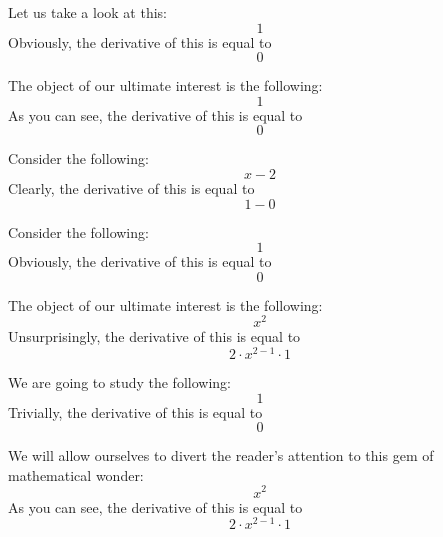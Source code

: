 \documentclass{article}
\begin{document}
Let us take a look at this:
\begin{equation}
1 
\end{equation}
Obviously, the derivative of this is equal to
\begin{equation}
0 
\end{equation}

The object of our ultimate interest is the following:
\begin{equation}
1 
\end{equation}
As you can see, the derivative of this is equal to
\begin{equation}
0 
\end{equation}

Consider the following:
\begin{equation}
x - 2 
\end{equation}
Clearly, the derivative of this is equal to
\begin{equation}
1 - 0 
\end{equation}

Consider the following:
\begin{equation}
1 
\end{equation}
Obviously, the derivative of this is equal to
\begin{equation}
0 
\end{equation}

The object of our ultimate interest is the following:
\begin{equation}
x ^{2 } 
\end{equation}
Unsurprisingly, the derivative of this is equal to
\begin{equation}
2 \cdot x ^{2 - 1 } \cdot 1 
\end{equation}

We are going to study the following:
\begin{equation}
1 
\end{equation}
Trivially, the derivative of this is equal to
\begin{equation}
0 
\end{equation}

We will allow ourselves to divert the reader's attention to this gem of mathematical wonder:
\begin{equation}
x ^{2 } 
\end{equation}
As you can see, the derivative of this is equal to
\begin{equation}
2 \cdot x ^{2 - 1 } \cdot 1 
\end{equation}
\end{document}
